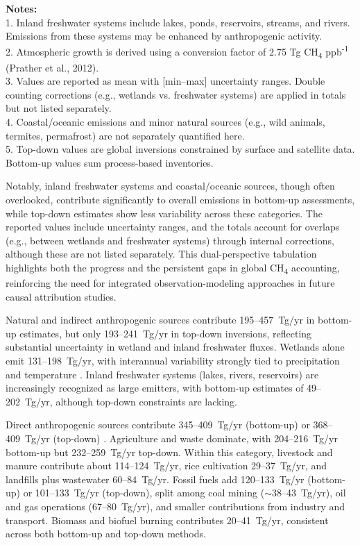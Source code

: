 \vspace{-1.5em}
\begin{flushleft}
{\footnotesize
\textbf{Notes:} \\
1. Inland freshwater systems include lakes, ponds, reservoirs, streams, and rivers. Emissions from these systems may be enhanced by anthropogenic activity.\\
2. Atmospheric growth is derived using a conversion factor of 2.75 Tg CH\textsubscript{4} ppb\textsuperscript{-1} (Prather et al., 2012).\\
3. Values are reported as mean with [min--max] uncertainty ranges. Double counting corrections (e.g., wetlands vs. freshwater systems) are applied in totals but not listed separately.\\
4. Coastal/oceanic emissions and minor natural sources (e.g., wild animals, termites, permafrost) are not separately quantified here.\\
5. Top-down values are global inversions constrained by surface and satellite data. Bottom-up values sum process-based inventories.
}
\end{flushleft}

Notably, inland freshwater systems and coastal/oceanic sources, though often overlooked, contribute significantly to overall emissions in bottom-up assessments, while top-down estimates show less variability across these categories. The reported values include uncertainty ranges, and the totals account for overlaps (e.g., between wetlands and freshwater systems) through internal corrections, although these are not listed separately. This dual-perspective tabulation highlights both the progress and the persistent gaps in global CH\textsubscript{4} accounting, reinforcing the need for integrated observation-modeling approaches in future causal attribution studies.

Natural and indirect anthropogenic sources contribute 195--457~Tg/yr in bottom-up estimates, but only 193--241~Tg/yr in top-down inversions, reflecting substantial uncertainty in wetland and inland freshwater fluxes. Wetlands alone emit 131--198~Tg/yr, with interannual variability strongly tied to precipitation and temperature \cite{Pandey2017, Knox2024}. Inland freshwater systems (lakes, rivers, reservoirs) are increasingly recognized as large emitters, with bottom-up estimates of 49--202~Tg/yr, although top-down constraints are lacking.

Direct anthropogenic sources contribute 345--409~Tg/yr (bottom-up) or 368--409~Tg/yr (top-down) \cite{global_methane_budget}. Agriculture and waste dominate, with 204--216~Tg/yr bottom-up but 232--259~Tg/yr top-down. Within this category, livestock and manure contribute about 114--124~Tg/yr, rice cultivation 29--37~Tg/yr, and landfills plus wastewater 60--84~Tg/yr. Fossil fuels add 120--133~Tg/yr (bottom-up) or 101--133~Tg/yr (top-down), split among coal mining ($\sim$38--43~Tg/yr), oil and gas operations (67--80~Tg/yr), and smaller contributions from industry and transport. Biomass and biofuel burning contributes 20--41~Tg/yr, consistent across both bottom-up and top-down methods.

